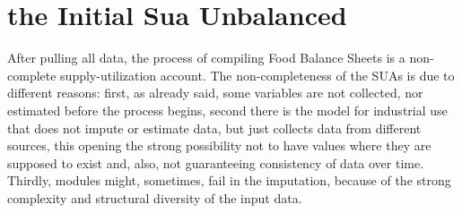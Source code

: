 \documentclass[]{article}
\begin{document}
\section{the Initial Sua Unbalanced}\label{the-initial-sua-unbalanced}

After pulling all data, the process of compiling Food Balance Sheets is
a non-complete supply-utilization account. The non-completeness of the
SUAs is due to different reasons: first, as already said, some variables
are not collected, nor estimated before the process begins, second there
is the model for industrial use that does not impute or estimate data,
but just collects data from different sources, this opening the strong
possibility not to have values where they are supposed to exist and,
also, not guaranteeing consistency of data over time. Thirdly, modules
might, sometimes, fail in the imputation, because of the strong
complexity and structural diversity of the input data.
\end{document}
